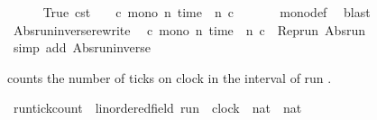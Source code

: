 \begin{isabellebody}
\isamarkupfalse%
\isanewline
\ \ \isamarkupfalse%
\ {\isacartoucheopen}{\isacharparenleft}{\isasymlambda}{\isacharunderscore}\ {\isacharunderscore}{\isachardot}\ {\isacharparenleft}True{\isacharcomma}\ {\isasymtau}\isactrlsub c\isactrlsub s\isactrlsub t\ {}{\isacharparenright}{\isacharparenright}\ {\isasymin}\ {\isacharbraceleft}{\isasymrho}{\isachardot}\ {\isasymforall}c{\isachardot}\ mono\ {\isacharparenleft}{\isasymlambda}n{\isachardot}\ time\ {\isacharparenleft}{\isasymrho}\ n\ c{\isacharparenright}{\isacharparenright}{\isacharbraceright}{\isacartoucheclose}\ \isanewline
\ \ \ \ \isamarkupfalse%
\ mono{\isacharunderscore}def\ \isamarkupfalse%
\ blast\isanewline
{}\isamarkupfalse%
%
\endisatagproof
{\isafoldproof}%
%
\isadelimproof
\isanewline
%
\endisadelimproof
\isanewline
{}\isamarkupfalse%
\ Abs{\isacharunderscore}run{\isacharunderscore}inverse{\isacharunderscore}rewrite{\isacharcolon}\isanewline
\ \ {\isacartoucheopen}{\isasymforall}c{\isachardot}\ mono\ {\isacharparenleft}{\isasymlambda}n{\isachardot}\ time\ {\isacharparenleft}{\isasymrho}\ n\ c{\isacharparenright}{\isacharparenright}\ {\isasymLongrightarrow}\ Rep{\isacharunderscore}run\ {\isacharparenleft}Abs{\isacharunderscore}run\ {\isasymrho}{\isacharparenright}\ {\isacharequal}\ {\isasymrho}{\isacartoucheclose}\isanewline
%
\isadelimproof
\ \ %
\endisadelimproof
%
\isatagproof
{}\isamarkupfalse%
\ {\isacharparenleft}simp\ add{\isacharcolon}\ Abs{\isacharunderscore}run{\isacharunderscore}inverse{\isacharparenright}%
\endisatagproof
{\isafoldproof}%
%
\isadelimproof
%
\endisadelimproof
%
\begin{isamarkuptext}%
 counts the number of ticks on clock  
  in the interval \isatt{[0{\char`\,}\ n]} of run \isa{{\isasymrho}}.%
\end{isamarkuptext}\isamarkuptrue%
\isamarkupfalse%
\ run{\isacharunderscore}tick{\isacharunderscore}count\ {\isacharcolon}{\isacharcolon}\ {\isacartoucheopen}{\isacharparenleft}{\isacharprime}{\isasymtau}{\isacharcolon}{\isacharcolon}linordered{\isacharunderscore}field{\isacharparenright}\ run\ {\isasymRightarrow}\ clock\ {\isasymRightarrow}\ nat\ {\isasymRightarrow}\ nat{\isacartoucheclose}\ {\isacharparenleft}{\isachardoublequoteopen}{\isacharhash}\isactrlsub {\isasymle}\ {\isacharunderscore}\ {\isacharunderscore}\ {\isacharunderscore}{\isachardoublequoteclose}{\isacharparenright}\ \isanewline

\end{isabellebody}
